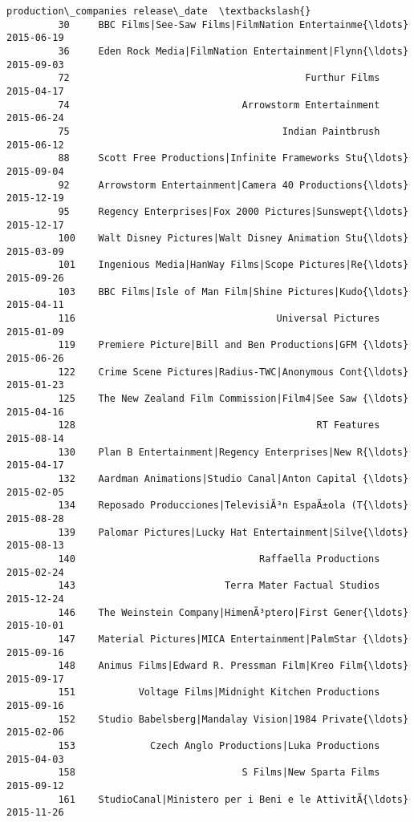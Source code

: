 \documentclass[11pt]{article}
\begin{document}
\begin{Verbatim}[commandchars=\\\{\}]
                                             production\_companies release\_date  \textbackslash{}
         30     BBC Films|See-Saw Films|FilmNation Entertainme{\ldots}   2015-06-19   
         36     Eden Rock Media|FilmNation Entertainment|Flynn{\ldots}   2015-09-03   
         72                                         Furthur Films   2015-04-17   
         74                              Arrowstorm Entertainment   2015-06-24   
         75                                     Indian Paintbrush   2015-06-12   
         88     Scott Free Productions|Infinite Frameworks Stu{\ldots}   2015-09-04   
         92     Arrowstorm Entertainment|Camera 40 Productions{\ldots}   2015-12-19   
         95     Regency Enterprises|Fox 2000 Pictures|Sunswept{\ldots}   2015-12-17   
         100    Walt Disney Pictures|Walt Disney Animation Stu{\ldots}   2015-03-09   
         101    Ingenious Media|HanWay Films|Scope Pictures|Re{\ldots}   2015-09-26   
         103    BBC Films|Isle of Man Film|Shine Pictures|Kudo{\ldots}   2015-04-11   
         116                                   Universal Pictures   2015-01-09   
         119    Premiere Picture|Bill and Ben Productions|GFM {\ldots}   2015-06-26   
         122    Crime Scene Pictures|Radius-TWC|Anonymous Cont{\ldots}   2015-01-23   
         125    The New Zealand Film Commission|Film4|See Saw {\ldots}   2015-04-16   
         128                                          RT Features   2015-08-14   
         130    Plan B Entertainment|Regency Enterprises|New R{\ldots}   2015-04-17   
         132    Aardman Animations|Studio Canal|Anton Capital {\ldots}   2015-02-05   
         134    Reposado Producciones|TelevisiÃ³n EspaÃ±ola (T{\ldots}   2015-08-28   
         139    Palomar Pictures|Lucky Hat Entertainment|Silve{\ldots}   2015-08-13   
         140                                Raffaella Productions   2015-02-24   
         143                          Terra Mater Factual Studios   2015-12-24   
         146    The Weinstein Company|HimenÃ³ptero|First Gener{\ldots}   2015-10-01   
         147    Material Pictures|MICA Entertainment|PalmStar {\ldots}   2015-09-16   
         148    Animus Films|Edward R. Pressman Film|Kreo Film{\ldots}   2015-09-17   
         151           Voltage Films|Midnight Kitchen Productions   2015-09-16   
         152    Studio Babelsberg|Mandalay Vision|1984 Private{\ldots}   2015-02-06   
         153             Czech Anglo Productions|Luka Productions   2015-04-03   
         158                             S Films|New Sparta Films   2015-09-12   
         161    StudioCanal|Ministero per i Beni e le AttivitÃ{\ldots}   2015-11-26   

\end{Verbatim}
\end{document}
